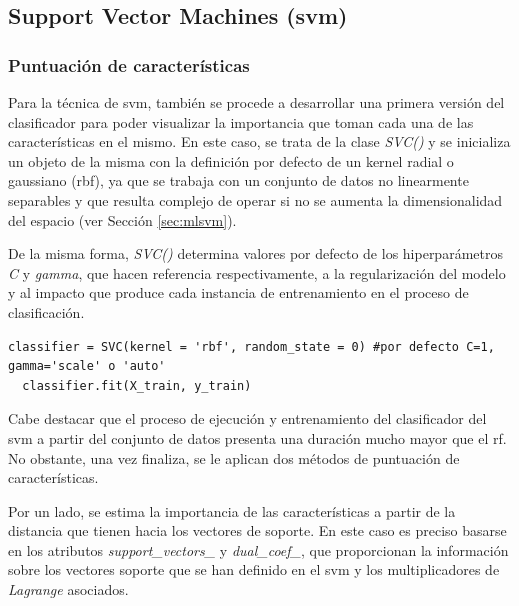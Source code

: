 
\subsection{Support Vector Machines (\acrshort{svm})}
\label{sec:svm}

\subsubsection{Puntuación de características}
\label{sec:svm1}

Para la técnica de \gls{svm}, también se procede a desarrollar una primera versión del clasificador para poder visualizar la importancia que toman cada una de las características en el mismo. En este caso, se trata de la clase \textit{SVC()} \cite{svc} y se inicializa un objeto de la misma con la definición por defecto de un kernel radial o gaussiano (\gls{rbf}), ya que se trabaja con un conjunto de datos no linearmente separables y que resulta complejo de operar si no se aumenta la dimensionalidad del espacio (ver Sección \ref{sec:mlsvm}). 

\vspace{3mm}

De la misma forma, \textit{SVC()} determina valores por defecto de los hiperparámetros \textit{C} y \textit{gamma}, que hacen referencia respectivamente, a la regularización del modelo y al impacto que produce cada instancia de entrenamiento en el proceso de clasificación. 

\vspace{3mm}

\begin{lstlisting}[style=Python, caption={Clasificador SVM por defecto}]
  classifier = SVC(kernel = 'rbf', random_state = 0) #por defecto C=1, gamma='scale' o 'auto'
  classifier.fit(X_train, y_train)
\end{lstlisting}
  
\vspace{3mm}

Cabe destacar que el proceso de ejecución y entrenamiento del clasificador del \gls{svm} a partir del conjunto de datos presenta una duración mucho mayor que el \gls{rf}. No obstante, una vez finaliza, se le aplican dos métodos de puntuación de características. 

\vspace{3mm}

Por un lado, se estima la importancia de las características a partir de la distancia que tienen hacia los vectores de soporte. En este caso es preciso basarse en los atributos \textit{support\_vectors\_} y \textit{dual\_coef\_}, que proporcionan la información sobre los vectores soporte que se han definido en el \gls{svm} y los multiplicadores de \textit{Lagrange} asociados. 

